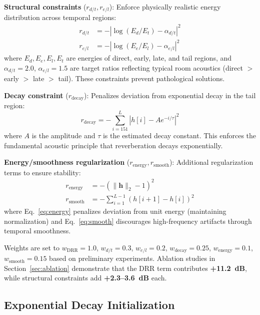 \documentclass[10pt,conference]{IEEEtran}
\begin{document}
\textbf{Structural constraints} ($r_{d/t}, r_{e/l}$): Enforce physically realistic energy distribution across temporal regions:
\begin{align}
r_{d/t} &= -|\log(E_d/E_t) - \alpha_{d/t}|^2 \label{eq:constraint_dt}\\
r_{e/l} &= -|\log(E_e/E_l) - \alpha_{e/l}|^2 \label{eq:constraint_el}
\end{align}
where $E_d, E_e, E_l, E_t$ are energies of direct, early, late, and tail regions, and $\alpha_{d/t}=2.0$, $\alpha_{e/l}=1.5$ are target ratios reflecting typical room acoustics (direct $>$ early $>$ late $>$ tail). These constraints prevent pathological solutions.

\textbf{Decay constraint} ($r_{\text{decay}}$): Penalizes deviation from exponential decay in the tail region:
\begin{equation}
r_{\text{decay}} = -\sum_{i=151}^{L} \left|h[i] - Ae^{-i/\tau}\right|^2
\label{eq:decay}
\end{equation}
where $A$ is the amplitude and $\tau$ is the estimated decay constant. This enforces the fundamental acoustic principle that reverberation decays exponentially.

\textbf{Energy/smoothness regularization} ($r_{\text{energy}}, r_{\text{smooth}}$): Additional regularization terms to ensure stability:
\begin{align}
r_{\text{energy}} &= -(\|\mathbf{h}\|_2 - 1)^2 \label{eq:energy}\\
r_{\text{smooth}} &= -\sum_{i=1}^{L-1}(h[i+1] - h[i])^2 \label{eq:smooth}
\end{align}
where Eq.~\ref{eq:energy} penalizes deviation from unit energy (maintaining normalization) and Eq.~\ref{eq:smooth} discourages high-frequency artifacts through temporal smoothness.

Weights are set to $w_{\text{DRR}}=1.0$, $w_{d/t}=0.3$, $w_{e/l}=0.2$, $w_{\text{decay}}=0.25$, $w_{\text{energy}}=0.1$, $w_{\text{smooth}}=0.15$ based on preliminary experiments. Ablation studies in Section~\ref{sec:ablation} demonstrate that the DRR term contributes \textbf{+11.2~dB}, while structural constraints add \textbf{+2.3--3.6~dB} each.

\subsection{Exponential Decay Initialization}
\end{document}
